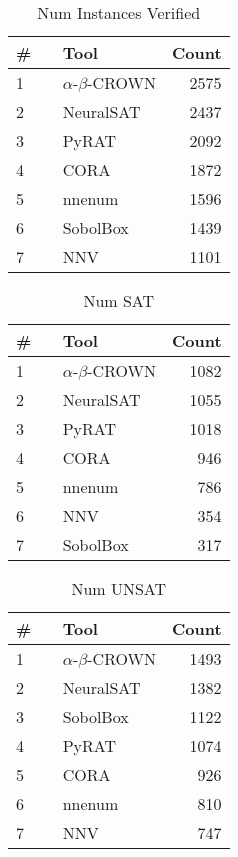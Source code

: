 \begin{table}[h]
\begin{center}
\caption{Num Instances Verified} \label{tab:stats1}
{\setlength{\tabcolsep}{2pt}
\begin{tabular}[h]{@{}llr@{}}
\toprule
\textbf{\# ~} & \textbf{Tool} & \textbf{Count}\\
\midrule
1 & $\alpha$-$\beta$-CROWN & 2575 \\
2 & NeuralSAT & 2437 \\
3 & PyRAT & 2092 \\
4 & CORA & 1872 \\
5 & nnenum & 1596 \\
6 & SobolBox & 1439 \\
7 & NNV & 1101 \\
\bottomrule
\end{tabular}
}
\end{center}
\end{table}




\begin{table}[h]
\begin{center}
\caption{Num SAT} \label{tab:stats2}
{\setlength{\tabcolsep}{2pt}
\begin{tabular}[h]{@{}llr@{}}
\toprule
\textbf{\# ~} & \textbf{Tool} & \textbf{Count}\\
\midrule
1 & $\alpha$-$\beta$-CROWN & 1082 \\
2 & NeuralSAT & 1055 \\
3 & PyRAT & 1018 \\
4 & CORA & 946 \\
5 & nnenum & 786 \\
6 & NNV & 354 \\
7 & SobolBox & 317 \\
\bottomrule
\end{tabular}
}
\end{center}
\end{table}




\begin{table}[h]
\begin{center}
\caption{Num UNSAT} \label{tab:stats3}
{\setlength{\tabcolsep}{2pt}
\begin{tabular}[h]{@{}llr@{}}
\toprule
\textbf{\# ~} & \textbf{Tool} & \textbf{Count}\\
\midrule
1 & $\alpha$-$\beta$-CROWN & 1493 \\
2 & NeuralSAT & 1382 \\
3 & SobolBox & 1122 \\
4 & PyRAT & 1074 \\
5 & CORA & 926 \\
6 & nnenum & 810 \\
7 & NNV & 747 \\
\bottomrule
\end{tabular}
}
\end{center}
\end{table}



